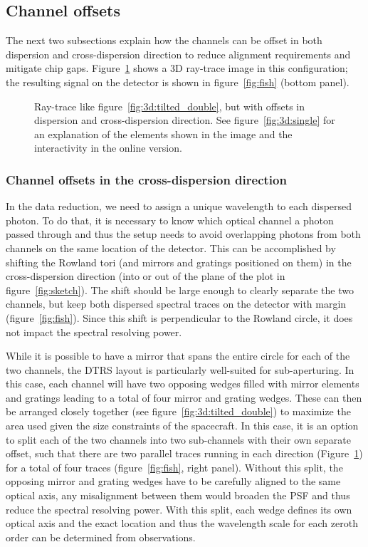 \documentclass[linenumbers]{aastex631}
\begin{document}
\subsection{Channel offsets}
The next two subsections explain how the channels can be offset in both dispersion and cross-dispersion direction to reduce alignment requirements and mitigate chip gaps. Figure~\ref{fig:3d:tilted_double_offset} shows a 3D ray-trace image in this configuration; the resulting signal on the detector is shown in figure~\ref{fig:fish} (bottom panel).
\begin{figure}
    \caption{Ray-trace like figure~\ref{fig:3d:tilted_double}, but with offsets in dispersion and cross-dispersion direction. See figure~\ref{fig:3d:single} for an explanation of the elements shown in the image and the interactivity in the online version.
        }
    \label{fig:3d:tilted_double_offset}
\end{figure}
\subsubsection{Channel offsets in the cross-dispersion direction}
In the data reduction, we need to assign a unique wavelength to each dispersed photon. To do that, it is necessary to know which optical channel a photon passed through and thus the setup needs to avoid overlapping photons from both channels on the same location of the detector. This can be accomplished by shifting the Rowland tori (and mirrors and gratings positioned on them) in the cross-dispersion direction (into or out of the plane of the plot in figure~\ref{fig:sketch}). The shift should be large enough to clearly separate the two channels, but keep both dispersed spectral traces on the detector with margin (figure~\ref{fig:fish}). Since this shift is perpendicular to the Rowland circle, it does not impact the spectral resolving power.

While it is possible to have a mirror that spans the entire circle for each of the two channels, the DTRS layout is particularly well-suited for sub-aperturing. In this case, each channel will have two opposing wedges filled with mirror elements and gratings leading to a total of four mirror and grating wedges. These can then be arranged closely together (see figure~\ref{fig:3d:tilted_double}) to maximize the area used given the size constraints of the spacecraft. In this case, it is an option to split each of the two channels into two sub-channels with their own separate offset, such that there are two parallel traces running in each direction (Figure~\ref{fig:3d:tilted_double_offset}) for a total of four traces (figure~\ref{fig:fish}, right panel). Without this split, the opposing mirror and grating wedges have to be carefully aligned to the same optical axis, any misalignment between them would broaden the PSF and thus reduce the spectral resolving power. With this split, each wedge defines its own optical axis and the exact location and thus the wavelength scale for each zeroth order can be determined from observations.
\end{document}
